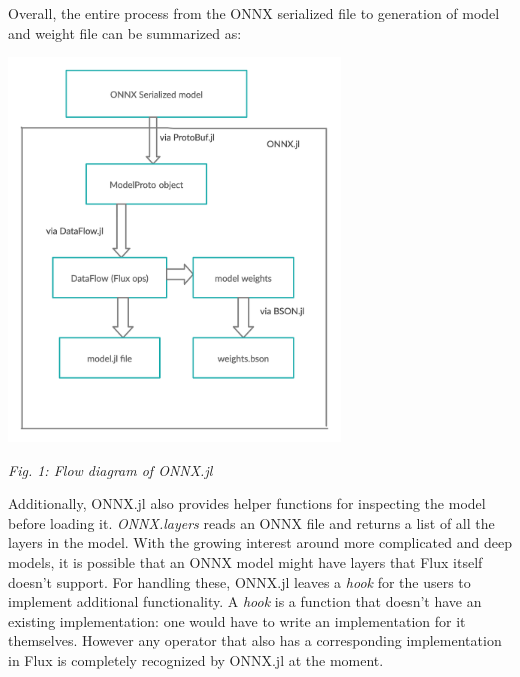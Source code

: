 \documentclass{juliacon}
\begin{document}
Overall, the entire process from the ONNX serialized file to generation of model and weight file can be
summarized as:  

\includegraphics[width=8.8cm]{onnx-3.png}

\begin{center}
    \textit{Fig. 1: Flow diagram of ONNX.jl}    
\end{center}

Additionally, ONNX.jl also provides helper functions for inspecting the model before loading it. \textit{ONNX.layers} reads an ONNX file and returns a list of all the layers in the model. With the growing 
interest around more complicated and deep models, it is possible that an ONNX model might have layers that Flux
itself doesn't support. For handling these, ONNX.jl leaves a \textit{hook} for the users to implement
additional functionality. A \textit{hook} is a function that doesn't have an existing implementation: one
would have to write an implementation for it themselves. However any operator that also has a corresponding
implementation in Flux is completely recognized by ONNX.jl at the moment.
\end{document}

